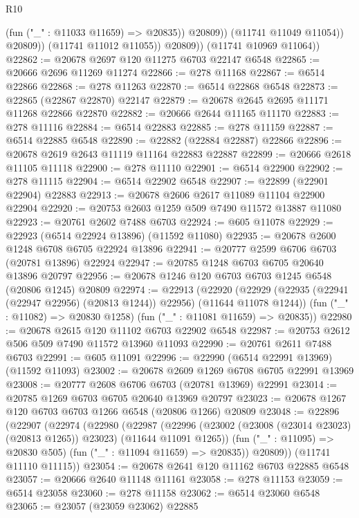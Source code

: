 \begin{lexlean}{R10}
\begin{coremodule}
                        (fun ("_" : @11033 @11659) => @20835))
                      @20809))
                  (@11741 @11049 @11054))
                @20809))
            (@11741 @11012 @11055))
          @20809))
      (@11741 @10969 @11064))
@22862 := @20678 @2697 @120 @11275 @6703 @22147 @6548
@22865 := @20666 @2696 @11269 @11274
@22866 := @278 @11168
@22867 := @6514 @22866
@22868 := @278 @11263
@22870 := @6514 @22868 @6548
@22873 := @22865 (@22867 @22870) @22147
@22879 := @20678 @2645 @2695 @11171 @11268 @22866 @22870
@22882 := @20666 @2644 @11165 @11170
@22883 := @278 @11116
@22884 := @6514 @22883
@22885 := @278 @11159
@22887 := @6514 @22885 @6548
@22890 := @22882 (@22884 @22887) @22866
@22896 := @20678 @2619 @2643 @11119 @11164 @22883 @22887
@22899 := @20666 @2618 @11105 @11118
@22900 := @278 @11110
@22901 := @6514 @22900
@22902 := @278 @11115
@22904 := @6514 @22902 @6548
@22907 := @22899 (@22901 @22904) @22883
@22913 := @20678 @2606 @2617 @11089 @11104 @22900 @22904
@22920 := @20753 @2603 @1259 @509 @7490 @11572 @13887 @11080
@22923 := @20761 @2602 @7488 @6703
@22924 := @605 @11078
@22929 := @22923 (@6514 @22924 @13896) (@11592 @11080)
@22935 := @20678 @2600 @1248 @6708 @6705 @22924 @13896
@22941 := @20777 @2599 @6706 @6703 (@20781 @13896) @22924
@22947 := @20785 @1248 @6703 @6705 @20640 @13896 @20797
@22956 := @20678 @1246 @120 @6703 @6703 @1245 @6548 (@20806 @1245) @20809
@22974 := @22913
    (@22920
      (@22929 (@22935 (@22941 (@22947 @22956) (@20813 @1244)) @22956) (@11644 @11078 @1244))
      (fun ("_" : @11082) => @20830 @1258)
      (fun ("_" : @11081 @11659) => @20835))
@22980 := @20678 @2615 @120 @11102 @6703 @22902 @6548
@22987 := @20753 @2612 @506 @509 @7490 @11572 @13960 @11093
@22990 := @20761 @2611 @7488 @6703
@22991 := @605 @11091
@22996 := @22990 (@6514 @22991 @13969) (@11592 @11093)
@23002 := @20678 @2609 @1269 @6708 @6705 @22991 @13969
@23008 := @20777 @2608 @6706 @6703 (@20781 @13969) @22991
@23014 := @20785 @1269 @6703 @6705 @20640 @13969 @20797
@23023 := @20678 @1267 @120 @6703 @6703 @1266 @6548 (@20806 @1266) @20809
@23048 := @22896
    (@22907
      (@22974
        (@22980
          (@22987
            (@22996 (@23002 (@23008 (@23014 @23023) (@20813 @1265)) @23023) (@11644 @11091 @1265))
            (fun ("_" : @11095) => @20830 @505)
            (fun ("_" : @11094 @11659) => @20835))
          @20809))
      (@11741 @11110 @11115))
@23054 := @20678 @2641 @120 @11162 @6703 @22885 @6548
@23057 := @20666 @2640 @11148 @11161
@23058 := @278 @11153
@23059 := @6514 @23058
@23060 := @278 @11158
@23062 := @6514 @23060 @6548
@23065 := @23057 (@23059 @23062) @22885

\end{coremodule}
\end{lexlean}
